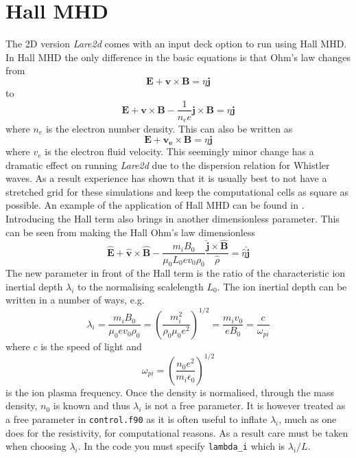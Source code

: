 \documentclass[11pt]{article}
\begin{document}
\section{Hall MHD}
The 2D version {\it Lare2d} comes with an input deck option to run using Hall MHD. In Hall MHD the only difference 
in the basic equations is that Ohm's law changes from
\begin{displaymath}
\mathbf{E}+\mathbf{v}\times\mathbf{B}=\eta \mathbf{j}
\end{displaymath}
to
\begin{displaymath}
\mathbf{E}+\mathbf{v}\times\mathbf{B}-\frac{1}{n_e e}\mathbf{j}\times\mathbf{B}=\eta \mathbf{j}
\end{displaymath}
where $n_e$ is the electron number density. This can also be written as
\begin{displaymath}
\mathbf{E}+\mathbf{v_e}\times\mathbf{B}=\eta \mathbf{j}
\end{displaymath}
where $v_e$ is the electron fluid velocity. This seemingly minor change has a dramatic effect on running {\it Lare2d} 
due to the dispersion relation for Whistler waves. As a result experience has shown that it is usually best to not 
have a stretched grid for these simulations and keep the computational cells as square as possible. An example of the 
application of Hall MHD can be found in \cite{hall}. Introducing the Hall term also brings in another dimensionless 
parameter. This can be seen from making the Hall Ohm's law dimensionless
\begin{displaymath}
\hat{\mathbf{E}}+\hat{\mathbf{v}}\times\hat{\mathbf{B}}-\frac{m_iB_0}{\mu_0 L_0 e v_0 \rho_0} 
\frac{\hat{\mathbf{j}}\times\hat{\mathbf{B}}}{\hat{\rho}}=\hat{\eta} \hat{\mathbf{j}}
\end{displaymath}
The new parameter in front of the Hall term is the ratio of the characteristic ion inertial depth $\lambda_i$ to the 
normalising scalelength $L_0$. The ion inertial depth can be written in a number of ways, e.g.
\begin{displaymath}
\lambda_i=\frac{m_i B_0}{\mu_0 e v_0 \rho_0} =\left(\frac{m_i^2}{\rho_0\mu_0e^2}\right)^{1/2}=\frac{m_i v_0}{e B_0}
=\frac{c}{\omega_{pi} }
\end{displaymath}
where $c$ is the speed of light and
\begin{displaymath}
\omega_{pi}=\left(\frac{n_0 e^2}{m_i \epsilon_0}\right)^{1/2}
\end{displaymath}
is the ion plasma frequency. Once the density is normalised, through the mass density, $n_0$ is known and thus 
$\lambda_i$ is not a free parameter. It is however treated as a free parameter in \texttt{control.f90} as it is 
often useful to inflate $\lambda_i$, much as one does for the resistivity, for computational reasons. As a result 
care must be taken when choosing $\lambda_i$. In the code you must specify {\tt lambda\_i} which is $\lambda_i/L$.
\end{document}
